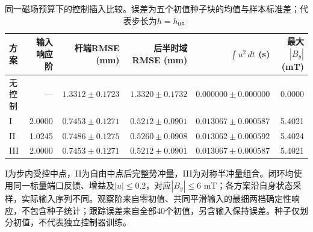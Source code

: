 \begin{table}[t]
\centering\small
\caption{同一磁场预算下的控制插入比较。误差为五个初值种子块的均值与样本标准差；代表步长为$h=h_0$。}
\label{tab:control}
\begin{tabular}{lrrrrr}
\toprule
方案 & 输入响应阶 & 杆端RMSE (mm) & 后半时域RMSE (mm) & $\int u^2\,dt$ (s) & 最大$|B_y|$ (mT) \\
\midrule
无控制 & --- & $1.3312\pm0.1723$ & $1.3320\pm0.1732$ & $0.000000\pm0.000000$ & 0.0000 \\
I & 2.0000 & $0.7453\pm0.1271$ & $0.5212\pm0.0901$ & $0.013067\pm0.000587$ & 5.4021 \\
II & 1.0245 & $0.7486\pm0.1275$ & $0.5260\pm0.0908$ & $0.013062\pm0.000592$ & 5.4024 \\
III & 2.0000 & $0.7453\pm0.1271$ & $0.5212\pm0.0901$ & $0.013067\pm0.000587$ & 5.4021 \\
\bottomrule
\end{tabular}
\par\smallskip\begin{minipage}{0.97\textwidth}\footnotesize I为步内受控中点，II为自由中点后完整势冲量，III为对称半冲量组合。闭环均使用同一标量端口反馈、增益及$|u|\leq0.2$，对应$|B_y|\leq6$ mT；各方案沿自身状态采样，实际输入序列不同。观察阶来自零初值、共同平滑输入的最细两档确定性响应，不包含种子统计；跟踪误差来自全部40个初值，另含输入保持误差。种子仅划分初值，不代表独立控制器训练。\end{minipage}
\end{table}
